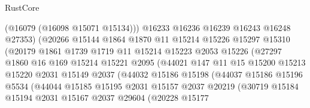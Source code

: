 \begin{lexlean}{RustCore}
\begin{coremodule}
                              (@16079 (@16098 @15071 @15134)))
                            @16233
                            @16236
                            @16239
                            @16243
                            @16248
                            @27353)
                          (@20266
                            @15144
                            @1864
                            @1870
                            @11
                            @15214
                            @15226
                            @15297
                            @15310
                            (@20179
                              @1861
                              @1739
                              @1719
                              @11
                              @15214
                              @15223
                              @2053
                              @15226
                              (@27297
                                @1860
                                @16
                                @169
                                @15214
                                @15221
                                @2095
                                (@44021
                                  @147
                                  @11
                                  @15
                                  @15200
                                  @15213
                                  @15220
                                  @2031
                                  @15149
                                  @2037
                                  (@44032
                                    @15186
                                    @15198
                                    (@44037
                                      @15186
                                      @15196
                                      @5534
                                      (@44044
                                        @15185
                                        @15195
                                        @2031
                                        @15157
                                        @2037
                                        @20219
                                        (@30719
                                          @15184
                                          @15194
                                          @2031
                                          @15167
                                          @2037
                                          @29604
                                          (@20228
                                            @15177

\end{coremodule}
\end{lexlean}
